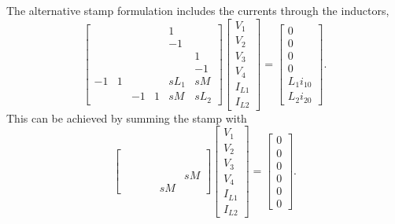 \documentclass[a4paper, 12pt]{article}
\begin{document}
The alternative stamp formulation includes the currents through the
inductors,
%
\begin{equation}
  \begin{bmatrix}
     &  &  &    &  1 & \\
     &  &  &    & -1 & \\
     &  &  &    &    & 1\\
     &  &  &    &    & -1\\
-1 & 1  &  &    & sL_1 & sM\\
     &  & -1 & 1 & sM & sL_2
  \end{bmatrix}
  \begin{bmatrix}
    V_1 \\ V_2 \\ V_3 \\ V_4 \\ I_{L1} \\ I_{L2}
  \end{bmatrix}
=
\begin{bmatrix}
  0 \\ 0 \\ 0 \\ 0 \\ L_1 i_{10} \\ L_2 i_{20}
\end{bmatrix}.
\end{equation}
%
This can be achieved by summing the stamp  with
%
\begin{equation}
  \begin{bmatrix}
     &  &  &    &    & \\
     &  &  &    &    & \\
     &  &  &    &    & \\
     &  &  &    &    & \\
     &  &  &    &    & sM\\
     &  &  &    & sM & 
  \end{bmatrix}
  \begin{bmatrix}
    V_1 \\ V_2 \\ V_3 \\ V_4 \\ I_{L1} \\ I_{L2}
  \end{bmatrix}
=
\begin{bmatrix}
  0 \\ 0 \\ 0 \\ 0 \\ 0 \\ 0
\end{bmatrix}.
\end{equation}
\end{document}
